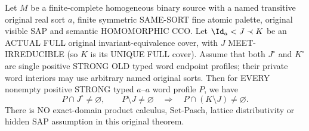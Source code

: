\begin{lemma}
\label{lem:typed-original-full-cover-interpolation}
Let $M$ be a finite-complete homogeneous
binary source with a named transitive
original real sort $a$, finite symmetric
SAME-SORT fine atomic palette, original
visible SAP and semantic HOMOMORPHIC CCO.
Let $\Id_a<J\prec K$ be an ACTUAL FULL
original invariant-equivalence cover,
with $J$ MEET-IRREDUCIBLE (so $K$
is its UNIQUE FULL cover).
Assume that both $J^\circ$ and $K^\circ$
are single positive STRONG OLD typed
word endpoint profiles; their private
word interiors may use arbitrary named
original sorts. Then for EVERY nonempty
positive STRONG typed $a$--$a$ word profile
$P$, we have
\[
 P\cap J^\circ\ne\varnothing,\qquad
 P\setminus J\ne\varnothing
   \quad\Longrightarrow\quad
                   P\cap(K\setminus J)\ne\varnothing.
\tag{OWI}\label{eq:typed-original-full-cover-interpolation}
\]
There is NO exact-domain product calculus,
Set-Pasch, lattice distributivity or hidden
SAP assumption in this original theorem.
\end{lemma}

